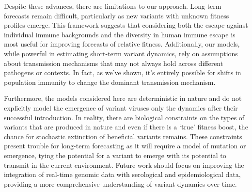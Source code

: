 \documentclass[11pt,oneside,letterpaper]{article}
\begin{document}

Despite these advances, there are limitations to our approach.
Long-term forecasts remain difficult, particularly as new variants with unknown fitness profiles emerge.
This framework suggests that considering both the escape against individual immune backgrounds and the diversity in human immune escape is most useful for improving forecasts of relative fitness.
Additionally, our models, while powerful in estimating short-term variant dynamics, rely on assumptions about transmission mechanisms that may not always hold across different pathogens or contexts.
In fact, as we've shown, it's entirely possible for shifts in population immunity to change the dominant transmission mechanism.

Furthermore, the models considered here are deterministic in nature and do not explicitly model the emergence of variant viruses only the dynamics after their successful introduction.
In reality, there are biological constraints on the types of variants that are produced in nature and even if there is a `true' fitness boost, the chance for stochastic extinction of beneficial variants remains.
These constraints present trouble for long-term forecasting as it will require a model of mutation or emergence, tying the potential for a variant to emerge with its potential to transmit in the current environment.
Future work should focus on improving the integration of real-time genomic data with serological and epidemiological data, providing a more comprehensive understanding of variant dynamics over time.


\end{document}
